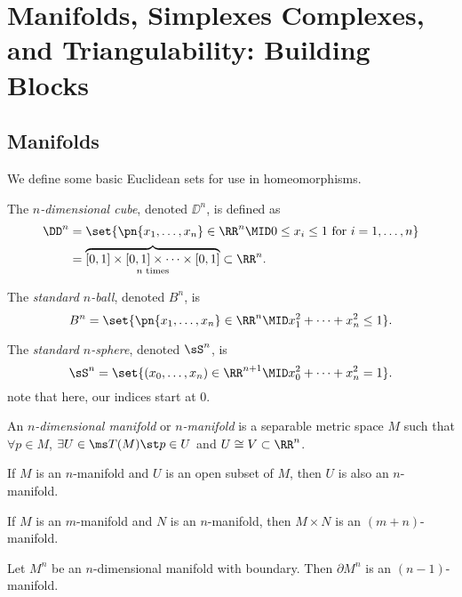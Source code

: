 \chapter[Homological Prereqs]{Manifolds, Simplexes Complexes, and Triangulability: Building Blocks}

\section{Manifolds}
We define some basic Euclidean sets for use in homeomorphisms.
\begin{definition}
  The \emph{$n$-dimensional cube}, denoted $\DD^n$, is defined as
  \begin{align*}
    \DD^n
    &= \set{\pn{x_1, \ldots, x_n} \in \RR^n \MID 0 \leq x_i \leq 1 \text{ for } i = 1, \ldots, n} \\
    &= \overbrace{[0,1] \times [0,1] \times \cdots \times [0,1]}_{n \text{ times}} \subset \RR^n.
  \end{align*}
\end{definition}
\begin{definition}
  The \emph{standard $n$-ball}, denoted $B^n$, is
  \[
    B^n = \set{\pn{x_1, \ldots, x_n} \in \RR^n \MID x_1^2 + \cdots + x^2_n \leq
      1}.
  \]
\end{definition}
\begin{definition}
  The \emph{standard $n$-sphere}, denoted $\sS^n$, is
  \[
    \sS^n = \set{(x_0, \ldots, x_n) \in \RR^{n+1} \MID x^2_0 + \cdots + x^2_n =
      1}.
  \]
  note that here, our indices start at $0$.
\end{definition}
\begin{definition}
  An \emph{$n$-dimensional manifold} or \emph{$n$-manifold} is a separable
  metric space $M$ such that $\forall p \in M$, $\exists U \in \ms T(M) \st p
  \in U$ and $U \cong V \subset \RR^n$.
\end{definition}
\begin{problem}[15.8]
  If $M$ is an $n$-manifold and $U$ is an open subset of $M$, then $U$ is also
  an $n$-manifold.
\end{problem}
\begin{problem}[15.9]
  If $M$ is an $m$-manifold and $N$ is an $n$-manifold, then $M \times N$ is an
  $(m+n)$-manifold.
\end{problem}
\begin{problem}[15.10]
  Let $M^n$ be an $n$-dimensional manifold with boundary. Then $\partial M^n$ is
  an $(n-1)$-manifold.
\end{problem}
